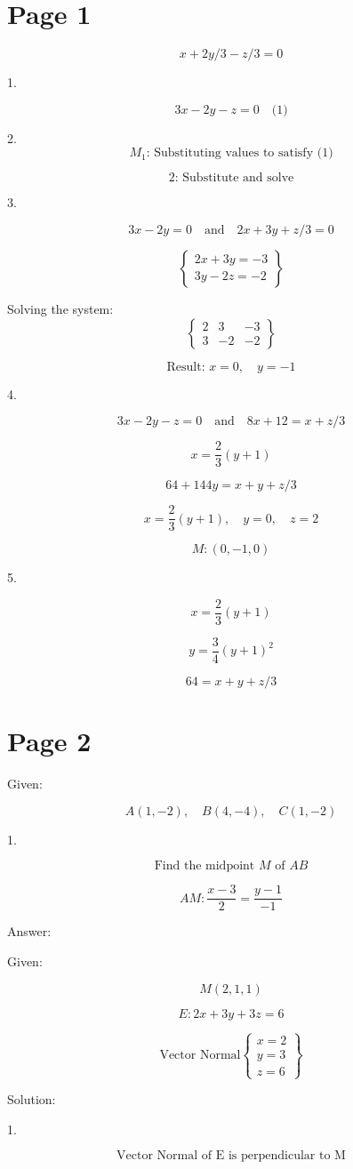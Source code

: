 \documentclass{article}
\begin{document}
\section*{Page 1}

\[
x + 2y/3 - z/3 = 0
\]

1. 

\[
3x - 2y - z = 0 \quad \text{(1)}
\]

2. 
\[
M_1 \text{: Substituting values to satisfy (1)}
\]

\[
\text{2: Substitute and solve}
\]

3. 

\[
3x - 2y = 0 \quad \text{and} \quad 2x + 3y + z/3 = 0
\]

\[
\left\{
\begin{array}{l}
2x + 3y = -3 \\
3y - 2z = -2
\end{array}
\right\}
\]

Solving the system:
\[
\left\{
\begin{array}{ccc}
2 & 3 & -3 \\
3 & -2 & -2 
\end{array}
\right\}
\]

\[
\text{Result: } x = 0, \quad y = -1
\]

4. 

\[
3x - 2y - z = 0 \quad \text{and} \quad 8x + 12 = x + z/3
\]

\[
x = \frac{2}{3}(y + 1)
\]

\[
64 + 144y = x + y + z/3
\]

\[
x = \frac{2}{3}(y+1), \quad y = 0, \quad z = 2
\]

\[
M: (0, -1, 0)
\]

5. 

\[
x = \frac{2}{3}(y+1)
\]

\[
y = \frac{3}{4}(y + 1)^2
\]

\[
64 = x + y + z/3
\]

\section*{Page 2}

Given: 

\[
A(1, -2), \quad B(4, -4), \quad C(1, -2)
\]

1. 

\[
\text{Find the midpoint } M \text{ of } AB
\]


\[
AM : \frac{x-3}{2} = \frac{y-1}{-1}
\]

Answer:

Given: 

\[
M(2,1,1)
\]

\[
E: 2x + 3y + 3z = 6
\]

\[
\text{Vector Normal} \left\{
\begin{array}{l}
x = 2 \\
y = 3 \\
z = 6
\end{array}
\right\}
\]

Solution:

1. 

\[
\text{Vector Normal of E is perpendicular to M}
\]
\end{document}
